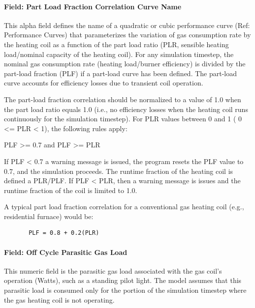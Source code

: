 \paragraph{Field: Part Load Fraction Correlation Curve Name}\label{field-part-load-fraction-correlation-curve-name-1}

This alpha field defines the name of a quadratic or cubic performance curve (Ref: Performance Curves) that parameterizes the variation of gas consumption rate by the heating coil as a function of the part load ratio (PLR, sensible heating load/nominal capacity of the heating coil). For any simulation timestep, the nominal gas consumption rate (heating load/burner efficiency) is divided by the part-load fraction (PLF) if a part-load curve has been defined. The part-load curve accounts for efficiency losses due to transient coil operation.

The part-load fraction correlation should be normalized to a value of 1.0 when the part load ratio equals 1.0 (i.e., no efficiency losses when the heating coil runs continuously for the simulation timestep). For PLR values between 0 and 1 ( 0 \textless{}= PLR \textless{} 1), the following rules apply:

PLF \textgreater{}= 0.7 and PLF \textgreater{}= PLR

If PLF \textless{} 0.7 a warning message is issued, the program resets the PLF value to 0.7, and the simulation proceeds. The runtime fraction of the heating coil is defined a PLR/PLF. If PLF \textless{} PLR, then a warning message is issues and the runtime fraction of the coil is limited to 1.0.

A typical part load fraction correlation for a conventional gas heating coil (e.g., residential furnace) would be:

\begin{lstlisting}
       PLF = 0.8 + 0.2(PLR)
\end{lstlisting}

\paragraph{Field: Off Cycle Parasitic Gas Load}\label{field-parasitic-gas-load-1}

This numeric field is the parasitic gas load associated with the gas coil's operation (Watts), such as a standing pilot light. The model assumes that this parasitic load is consumed only for the portion of the simulation timestep where the gas heating coil is not operating.

